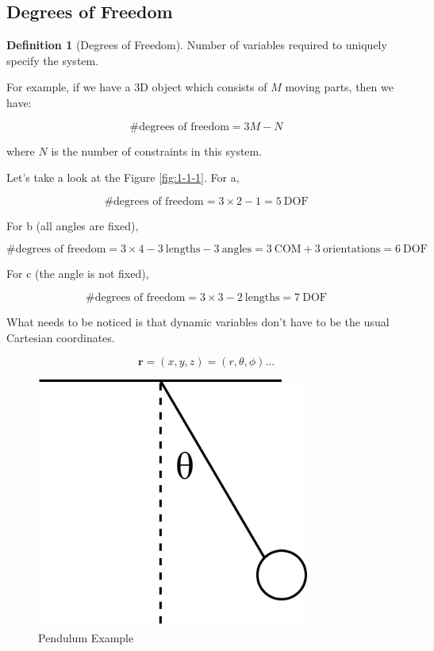 \documentclass{article}
\theoremstyle{definition}
\newtheorem{definition}{Definition}[section]
\theoremstyle{plain}
\theoremstyle{remark}
\begin{document}
\subsection{Degrees of Freedom}

\begin{definition}[Degrees of Freedom]
    Number of variables required to uniquely specify the system.
\end{definition}

For example, if we have a 3D object which consists of $M$ moving parts, then we have:

\[
    \text{\# degrees of freedom} = 3M -N
\]

where $N$ is the number of constraints in this system.

Let's take a look at the Figure \ref{fig:1-1-1}. For a, 

\[
    \text{\# degrees of freedom} = 3 \times 2 - 1 = 5 \ \text{DOF}
\]

For b (all angles are fixed),

\[
    \text{\# degrees of freedom} = 3 \times 4 - 3 \ \text{lengths} - 3 \ \text{angles} = 3 \ \text{COM} + 3 \ \text{orientations} = 6 \ \text{DOF}
\]

For c (the angle is not fixed),

\[
    \text{\# degrees of freedom} = 3 \times 3 - 2 \ \text{lengths} = 7 \ \text{DOF}
\]

What needs to be noticed is that dynamic variables don't have to be the usual Cartesian coordinates.

\[
    \mathbf{r} = (x, y, z) = (r, \theta, \phi) ...
\]

\begin{figure}[h]
  \centering
  \includegraphics[width=0.8\textwidth]{images/1-1-2.png}
  \caption{Pendulum Example}
  \label{fig:1-1-2}
\end{figure}
\end{document}
